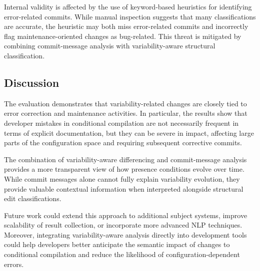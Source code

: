 Internal validity is affected by the use of keyword-based heuristics for identifying error-related commits. While manual inspection suggests that many classifications are accurate, the heuristic may both miss error-related commits and incorrectly flag maintenance-oriented changes as bug-related. This threat is mitigated by combining commit-message analysis with variability-aware structural classification.

\subsection{Discussion}


The evaluation demonstrates that variability-related changes are closely tied to error correction and maintenance activities. In particular, the results show that developer mistakes in conditional compilation are not necessarily frequent in terms of explicit documentation, but they can be severe in impact, affecting large parts of the configuration space and requiring subsequent corrective commits.

The combination of variability-aware differencing and commit-message analysis provides a more transparent view of how presence conditions evolve over time. While commit messages alone cannot fully explain variability evolution, they provide valuable contextual information when interpreted alongside structural edit classifications.

Future work could extend this approach to additional subject systems, improve scalability of result collection, or incorporate more advanced NLP techniques. Moreover, integrating variability-aware analysis directly into development tools could help developers better anticipate the semantic impact of changes to conditional compilation and reduce the likelihood of configuration-dependent errors.

